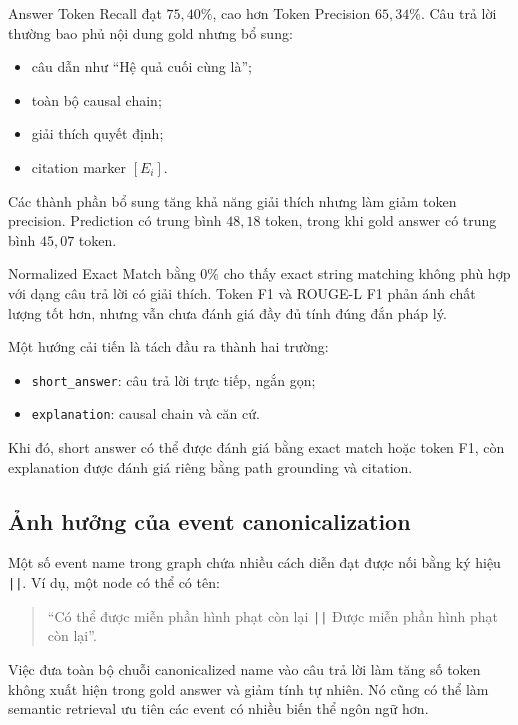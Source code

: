 Answer Token Recall đạt \(75{,}40\%\), cao hơn Token Precision
\(65{,}34\%\). Câu trả lời thường bao phủ nội dung gold nhưng bổ sung:

\begin{itemize}
    \item câu dẫn như ``Hệ quả cuối cùng là'';
    \item toàn bộ causal chain;
    \item giải thích quyết định;
    \item citation marker \([E_i]\).
\end{itemize}

Các thành phần bổ sung tăng khả năng giải thích nhưng làm giảm token
precision. Prediction có trung bình \(48{,}18\) token, trong khi gold answer
có trung bình \(45{,}07\) token.

Normalized Exact Match bằng \(0\%\) cho thấy exact string matching không phù
hợp với dạng câu trả lời có giải thích. Token F1 và ROUGE-L F1 phản ánh chất
lượng tốt hơn, nhưng vẫn chưa đánh giá đầy đủ tính đúng đắn pháp lý.

Một hướng cải tiến là tách đầu ra thành hai trường:

\begin{itemize}
    \item \texttt{short\_answer}: câu trả lời trực tiếp, ngắn gọn;
    \item \texttt{explanation}: causal chain và căn cứ.
\end{itemize}

Khi đó, short answer có thể được đánh giá bằng exact match hoặc token F1,
còn explanation được đánh giá riêng bằng path grounding và citation.

\subsection{Ảnh hưởng của event canonicalization}

Một số event name trong graph chứa nhiều cách diễn đạt được nối bằng ký hiệu
\texttt{||}. Ví dụ, một node có thể có tên:

\begin{quote}
``Có thể được miễn phần hình phạt còn lại
\texttt{||}
Được miễn phần hình phạt còn lại''.
\end{quote}

Việc đưa toàn bộ chuỗi canonicalized name vào câu trả lời làm tăng số token
không xuất hiện trong gold answer và giảm tính tự nhiên. Nó cũng có thể làm
semantic retrieval ưu tiên các event có nhiều biến thể ngôn ngữ hơn.


